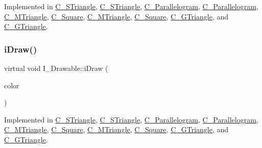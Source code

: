 Implemented in \hyperlink{classC__STriangle_a7297480fe52b58654d81e2e70fbb237d}{C\+\_\+\+S\+Triangle}, \hyperlink{classC__STriangle_a7297480fe52b58654d81e2e70fbb237d}{C\+\_\+\+S\+Triangle}, \hyperlink{classC__Parallelogram_a6d43cc787a39def68c7b7de4a33caf5e}{C\+\_\+\+Parallelogram}, \hyperlink{classC__Parallelogram_a6d43cc787a39def68c7b7de4a33caf5e}{C\+\_\+\+Parallelogram}, \hyperlink{classC__MTriangle_ae75dd212f0b580664affc740945c8d0b}{C\+\_\+\+M\+Triangle}, \hyperlink{classC__Square_ae6c51a7720576bcbb94b52584552df28}{C\+\_\+\+Square}, \hyperlink{classC__MTriangle_ae75dd212f0b580664affc740945c8d0b}{C\+\_\+\+M\+Triangle}, \hyperlink{classC__Square_ae6c51a7720576bcbb94b52584552df28}{C\+\_\+\+Square}, \hyperlink{classC__GTriangle_a53abbd8cd622323fc2f3b80ce91cfde9}{C\+\_\+\+G\+Triangle}, and \hyperlink{classC__GTriangle_a53abbd8cd622323fc2f3b80ce91cfde9}{C\+\_\+\+G\+Triangle}.

\mbox{\label{classI__Drawable_a25f6474325614c451a91f019e5fe8010}} 
\subsubsection{\texorpdfstring{i\+Draw()}{iDraw()}\hspace{0.1cm}{\footnotesize\ttfamily [3/4]}}
{\footnotesize\ttfamily virtual void I\+\_\+\+Drawable\+::i\+Draw (\begin{DoxyParamCaption}\item[{M\+L\+V\+\_\+\+Color}]{color }\end{DoxyParamCaption})\hspace{0.3cm}{\ttfamily [pure virtual]}}



Implemented in \hyperlink{classC__STriangle_ad003b932a467de60b814d897fda38390}{C\+\_\+\+S\+Triangle}, \hyperlink{classC__STriangle_ad003b932a467de60b814d897fda38390}{C\+\_\+\+S\+Triangle}, \hyperlink{classC__Parallelogram_a044ce6d1042ea93589a38f4686489862}{C\+\_\+\+Parallelogram}, \hyperlink{classC__Parallelogram_a044ce6d1042ea93589a38f4686489862}{C\+\_\+\+Parallelogram}, \hyperlink{classC__MTriangle_a049e6026145865387db4244678336784}{C\+\_\+\+M\+Triangle}, \hyperlink{classC__Square_a47a80c25bbeda17f17a8230127b4a5ed}{C\+\_\+\+Square}, \hyperlink{classC__MTriangle_a049e6026145865387db4244678336784}{C\+\_\+\+M\+Triangle}, \hyperlink{classC__Square_a47a80c25bbeda17f17a8230127b4a5ed}{C\+\_\+\+Square}, \hyperlink{classC__GTriangle_a9cfd20cb1d19e6c92bd217c470c86405}{C\+\_\+\+G\+Triangle}, and \hyperlink{classC__GTriangle_a9cfd20cb1d19e6c92bd217c470c86405}{C\+\_\+\+G\+Triangle}.

